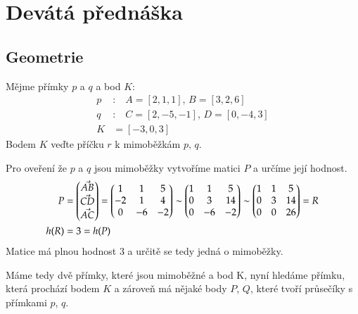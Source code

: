 \section{Devátá přednáška}
\subsection{Geometrie}

\begin{example}
    Mějme přímky $p$ a $q$ a bod $K$:
    \begin{align*}
        p&:\;\;\;A=[2, 1, 1],\,B = [3, 2, 6]\\
        q&:\;\;\;C=[2, -5, -1],\,D = [0, -4, 3]\\
        K &= [-3, 0, 3]
    \end{align*}
    Bodem $K$ veďte příčku $r$ k mimoběžkám $p,\,q$.

    Pro oveření že $p$ a $q$ jsou mimoběžky vytvoříme matici $P$ a určíme její hodnost.
    \begin{align*}
        P &= \begin{pmatrix}
            \vec{AB}\\
            \vec{CD}\\
            \vec{AC}
        \end{pmatrix} =
        \begin{pmatrix}
            1 & 1 & 5\\
            -2 & 1 & 4\\
            0 & -6 & -2
        \end{pmatrix} \overset{} \sim
        \begin{pmatrix}
            1 & 1 & 5\\
            0 & 3 & 14\\
            0 & -6 & -2
        \end{pmatrix} \overset{} \sim
        \begin{pmatrix}
            1 & 1 & 5\\
            0 & 3 & 14\\
            0 & 0 & 26
        \end{pmatrix} = R\\
        h(R) &= 3 = h(P)
    \end{align*}
    Matice má plnou hodnost $3$ a určitě se tedy jedná o mimoběžky.

    Máme tedy dvě přímky, které jsou mimoběžné a bod K, nyní hledáme
    přímku, která prochází bodem $K$ a zároveň má nějaké body $P$, $Q$,
    které tvoří průsečíky s přímkami $p$, $q$.


\end{example}
